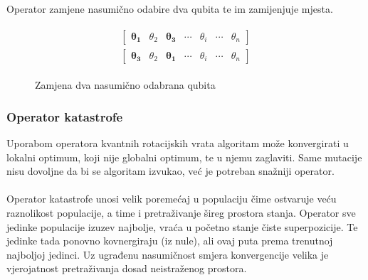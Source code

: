 \documentclass[times, utf8, zavrsni, numeric]{fer}
\begin{document}
\paragraph{}
Operator zamjene nasumično odabire dva qubita te im zamijenjuje mjesta.
\begin{figure}[htb]
\centering
\begin{align*}
\begin{split}
\begin{bmatrix}
\boldsymbol{\theta_{1}} & \theta_{2} & \boldsymbol{\theta_{3}} & \cdots & \theta_{i} & \cdots & \theta_{n}
\end{bmatrix} 
\\
\begin{bmatrix}
\boldsymbol{\theta_{3}} & \theta_{2} & \boldsymbol{\theta_{1}} & \cdots & \theta_{i} & \cdots & \theta_{n}
\end{bmatrix}
\end{split}
\end{align*}
\caption{Zamjena dva nasumično odabrana qubita}
\label{fig:mut_swap}
\end{figure}

\subsubsection{Operator katastrofe}
Uporabom operatora kvantnih rotacijskih vrata algoritam može konvergirati u lokalni optimum, koji nije globalni optimum, te u njemu zaglaviti. Same mutacije nisu dovoljne da bi se algoritam izvukao, već je potreban snažniji operator.

\paragraph{}
Operator katastrofe unosi velik poremećaj u populaciju čime ostvaruje veću raznolikost populacije, a time i pretraživanje šireg prostora stanja. Operator sve jedinke populacije izuzev najbolje, vraća u početno stanje čiste superpozicije. Te jedinke tada ponovno kovnergiraju (iz nule), ali ovaj puta prema trenutnoj najboljoj jedinci. Uz ugrađenu nasumičnost smjera konvergencije velika je vjerojatnost pretraživanja dosad neistraženog prostora.
\end{document}
